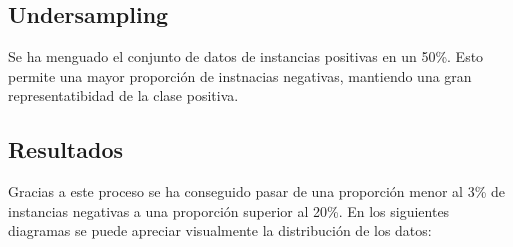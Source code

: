 \documentclass[12pt]{report} %
\begin{document}
    \subsection{Undersampling}

    Se ha menguado el conjunto de datos de instancias positivas en un 50\%. Esto permite una mayor proporción de instnacias negativas, mantiendo una gran representatibidad de la clase positiva.

    \subsection{Resultados}

    Gracias a este proceso se ha conseguido pasar de una proporción menor al 3\% de instancias negativas a una proporción superior al 20\%. En los siguientes diagramas se puede apreciar visualmente la distribución de los datos: 
\end{document}
